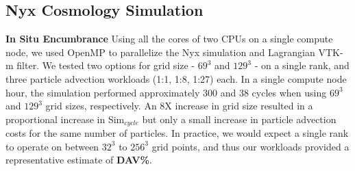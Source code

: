 \documentclass[runningheads]{llncs}
\begin{document}
\subsection{Nyx Cosmology Simulation}
\label{sec:nyx}
\noindent\textbf{In Situ Encumbrance}
Using all the cores of two CPUs on a single compute node, we used OpenMP to parallelize the Nyx simulation and Lagrangian VTK-m filter.
%
We tested two options for grid size - $69^{3}$ and $129^{3}$ - on a single rank, and three particle advection workloads (1:1, 1:8, 1:27) each.
%
In a single compute node hour, the simulation performed approximately 300 and 38 cycles when using $69^{3}$ and $129^{3}$ grid sizes, respectively.
%
%
An 8X increase in grid size resulted in a proportional increase in Sim$_{cycle}$ but only a small increase in particle advection costs for the same number of particles.
%
In practice, we would expect a single rank to operate on between $32^{3}$ to $256^{3}$ grid points, and thus our workloads provided a representative estimate of \textbf{DAV\%}.
%
\end{document}
